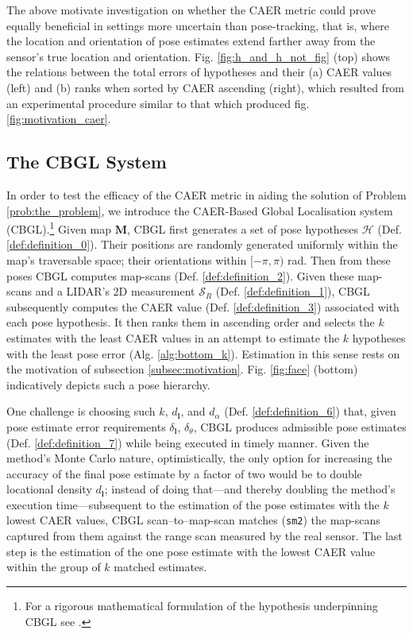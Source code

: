 The above motivate investigation on whether the CAER metric could prove equally
beneficial in settings more uncertain than pose-tracking, that is, where the
location and orientation of pose estimates extend farther away from the
sensor's true location and orientation. Fig. \ref{fig:h_and_h_not_fig} (top)
shows the relations between the total errors of hypotheses and
their (a) CAER values (left) and (b) ranks when sorted by CAER ascending (right),
which resulted from an experimental procedure similar to that which produced fig.
\ref{fig:motivation_caer}.

\subsection{The CBGL System}

In order to test the efficacy of the CAER metric in aiding the solution of
Problem \ref{prob:the_problem}, we introduce the CAER-Based Global Localisation
system (CBGL).\footnote{For a rigorous mathematical formulation of the
hypothesis underpinning CBGL see \cite{cbglarxiv}.} Given map $\bm{M}$, CBGL
first generates a set of pose hypotheses $\mathcal{H}$ (Def.
\ref{def:definition_0}). Their positions are randomly generated
uniformly within the map's traversable space; their orientations within
$[-\pi,\pi)$ rad. Then from these poses CBGL computes map-scans (Def.
\ref{def:definition_2}). Given these map-scans and a LIDAR's 2D measurement
$\mathcal{S}_R$ (Def. \ref{def:definition_1}), CBGL subsequently computes the
CAER value (Def. \ref{def:definition_3}) associated with each pose hypothesis.
It then ranks them in ascending order and selects the $k$ estimates with the
least CAER values in an attempt to estimate the $k$ hypotheses with the least
pose error (Alg. \ref{alg:bottom_k}). Estimation in this sense rests on the
motivation of subsection \ref{subsec:motivation}. Fig. \ref{fig:face} (bottom)
indicatively depicts such a pose hierarchy.

One challenge is choosing such $k$, $d_{\bm{l}}$, and $d_\alpha$ (Def.
\ref{def:definition_6}) that, given pose estimate error requirements
$\delta_{\bm{l}}$, $\delta_{\theta}$, CBGL produces admissible pose estimates
(Def. \ref{def:definition_7}) while being executed in timely manner.  Given the
method's Monte Carlo nature, optimistically, the only option for increasing the
accuracy of the final pose estimate by a factor of two would be to double
locational density $d_{\bm{l}}$; instead of doing that---and thereby doubling
the method's execution time---subsequent to the estimation of the pose
estimates with the $k$ lowest CAER values, CBGL scan--to--map-scan matches
(\texttt{sm2}) \cite{Vasiljevic2016c,Filotheou2023a} the map-scans captured
from them against the range scan measured by the real sensor.  The last step is
the estimation of the one pose estimate with the lowest CAER value within the
group of $k$ matched estimates.

